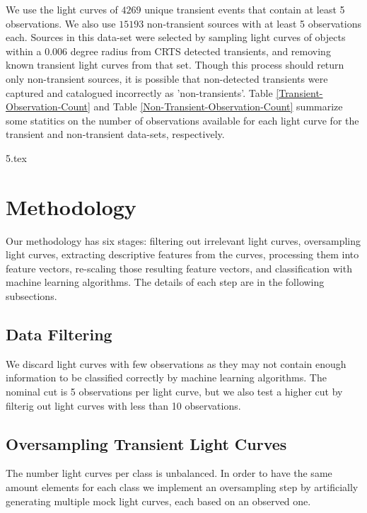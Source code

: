 \documentclass[a4paper,fleqn,usenatbib]{mnras}
\begin{document}
We use the light curves of $4269$ unique transient events that
contain at least 5 observations.
We also use  $15193$ non-transient sources with at least 5 observations each. 
Sources in this data-set were selected by sampling light curves
of objects within a 0.006 degree radius from CRTS detected transients,
and removing known transient light curves from that set. 
Though this process should return only non-transient sources, it is
possible that non-detected transients were captured and catalogued
incorrectly as 'non-transients'.  
Table \ref{Transient-Observation-Count} and
Table \ref{Non-Transient-Observation-Count} summarize some statitics
on the number of observations available for each light curve for the
transient and non-transient data-sets, respectively.  



{5.tex}


\section{Methodology} \label{section_method}

Our methodology has six stages: 
filtering out irrelevant light curves, oversampling light curves, extracting
descriptive features from the curves, processing them into feature
vectors, re-scaling those resulting feature vectors, and 
classification with machine learning algorithms. 
The details of each step are in the following subsections.

\subsection{Data Filtering} \label{subsection_filtering}

We discard light curves with few observations as they may not contain
enough information to be classified correctly by machine learning
algorithms.  
The nominal cut is 5 observations per light curve, but we also test a
higher cut by filterig out light curves with less than 10 observations.

\subsection{Oversampling Transient Light Curves} \label{subsection_oversampling}

The number light curves per class is unbalanced. 
In order to have the same amount elements for each class we implement an
oversampling step by artificially generating multiple mock light curves,
each based on an observed one. 
\end{document}

